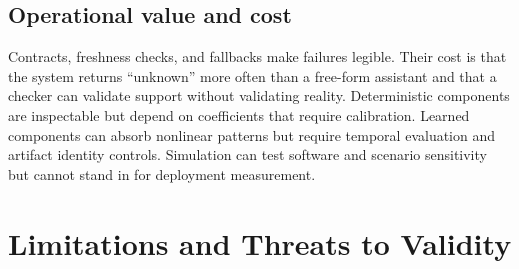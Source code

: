 \documentclass[conference]{IEEEtran}
\begin{document}
\subsection{Operational value and cost}
Contracts, freshness checks, and fallbacks make failures legible. Their cost is that the system returns ``unknown'' more often than a free-form assistant and that a checker can validate support without validating reality. Deterministic components are inspectable but depend on coefficients that require calibration. Learned components can absorb nonlinear patterns but require temporal evaluation and artifact identity controls. Simulation can test software and scenario sensitivity but cannot stand in for deployment measurement.

\section{Limitations and Threats to Validity}
\end{document}
